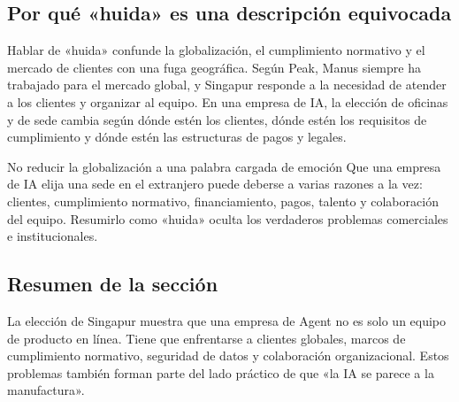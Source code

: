 \subsection{Por qué «huida» es una descripción equivocada}

Hablar de «huida» confunde la globalización, el cumplimiento normativo y el mercado de clientes con una fuga geográfica. Según Peak, Manus siempre ha trabajado para el mercado global, y Singapur responde a la necesidad de atender a los clientes y organizar al equipo. En una empresa de IA, la elección de oficinas y de sede cambia según dónde estén los clientes, dónde estén los requisitos de cumplimiento y dónde estén las estructuras de pagos y legales.

\begin{warningbox}{No reducir la globalización a una palabra cargada de emoción}
Que una empresa de IA elija una sede en el extranjero puede deberse a varias razones a la vez: clientes, cumplimiento normativo, financiamiento, pagos, talento y colaboración del equipo. Resumirlo como «huida» oculta los verdaderos problemas comerciales e institucionales.
\end{warningbox}

\subsection{Resumen de la sección}

La elección de Singapur muestra que una empresa de Agent no es solo un equipo de producto en línea. Tiene que enfrentarse a clientes globales, marcos de cumplimiento normativo, seguridad de datos y colaboración organizacional. Estos problemas también forman parte del lado práctico de que «la IA se parece a la manufactura».


